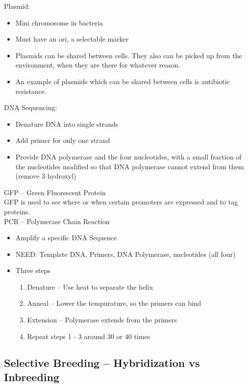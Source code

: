 \documentclass{article}
\begin{document}
Plasmid:
\begin{itemize}
\item Mini chromosome in bacteria
\item Must have an ori, a selectable marker
\item Plasmids can be shared between cells. They also can be picked up from the
environment, when they are there for whatever reason.
\item An example of plasmids which can be shared between cells is antibiotic resistance.
\end{itemize}

DNA Sequencing:
\begin{itemize}
\item Denature DNA into single strands
\item Add primer for only one strand
\item Provide DNA polymerase and the four nucleotides, with a small fraction of the nucleotides modified so that DNA polymerase cannot extend from them (remove 3 hydroxyl)
\end{itemize}

GFP -- Green Fluorescent Protein\\
\indent GFP is used to see where or when certain promoters are expressed and to tag proteins.\\

PCR -- Polymerase Chain Reaction\\
\begin{itemize}
\item Amplify a specific DNA Sequence
\item NEED: Template DNA, Primers, DNA Polymerase, nucleotides (all four)
\item Three steps
\begin{enumerate}
\item Denature -- Use heat to separate the helix
\item Anneal -- Lower the tempurature, so the primers can bind
\item Extension -- Polymerase extends from the primers
\item Repeat steps 1 - 3 around 30 or 40 times
\end{enumerate}

\end{itemize}


\subsection{Selective Breeding -- Hybridization vs Inbreeding}
\end{document}
